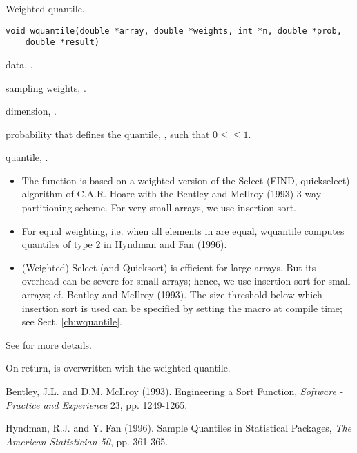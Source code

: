 \documentclass[a4paper,oneside,10pt,DIV=12]{scrartcl}
\def\DATA#1#2#3{
	\item[\code{#1}] #2, \code{double array[#3]}.}
\def\WEIGHTS#1{
	\item[\code{#1}] sampling weights, \code{double array[n]}.
}
\begin{document}
\begin{Description}
Weighted quantile.
\end{Description}
\begin{Usage}
\begin{verbatim}
void wquantile(double *array, double *weights, int *n, double *prob,
    double *result)
\end{verbatim}
\end{Usage}
\begin{Arguments}
	\begin{ldescription}
		\DATA{array}{data}{n}
		\WEIGHTS{weights}
		\item[\code{n}] dimension, .
		\item[\code{prob}] probability that defines the quantile,
			, such that $0 \leq$$\leq 1$.
		\item[\code{result}] quantile, .
	\end{ldescription}
\end{Arguments}
\begin{Details}
	\begin{itemize}
	\item The function is based on a weighted version of the Select (FIND,
		quickselect) algorithm of C.A.R. Hoare with the Bentley and McIlroy
		(1993) 3-way partitioning scheme.
		For very small arrays, we use insertion sort.
	\item For equal weighting, i.e. when all elements in  are
		equal, wquantile computes quantiles of type 2 in Hyndman and Fan
		(1996).
	\item (Weighted) Select (and Quicksort) is efficient for large arrays. But
		its overhead can be severe for small arrays; hence, we use insertion
		sort for small arrays; cf. Bentley and McIlroy (1993). The size
		threshold below which insertion sort is used can be specified by
		setting the macro  at compile time; see Sect.
		\ref{ch:wquantile}.
	\end{itemize}

See  for more details.
\end{Details}
\begin{Dependency}
\end{Dependency}
\begin{Value}
On return,  is overwritten with the weighted quantile.
\end{Value}
\begin{References}\relax
Bentley, J.L. and D.M. McIlroy (1993). Engineering a Sort Function,
\textit{Software - Practice and Experience} 23, pp. 1249-1265.

Hyndman, R.J. and Y. Fan (1996). Sample Quantiles in Statistical Packages,
\textit{The American Statistician 50}, pp. 361-365.
\end{References}
\end{document}
